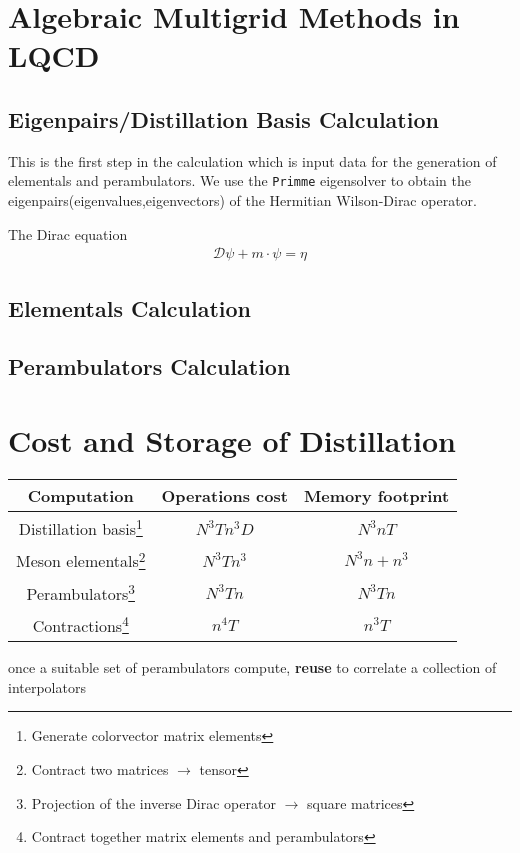 \section{Algebraic Multigrid Methods in LQCD}

\subsection{Eigenpairs/Distillation Basis Calculation}
This is the first step in the calculation which is input data for the generation of elementals and perambulators. We use the \verb|Primme| eigensolver to obtain the eigenpairs(eigenvalues,eigenvectors) of the Hermitian Wilson-Dirac operator\cite{PRIMME}\cite{Frommer:2020ovr}. 

The Dirac equation 
\begin{align}
  \mathcal{D}\psi + m \cdot \psi = \eta
\end{align}


\subsection{Elementals Calculation}

\subsection{Perambulators Calculation}

\section{Cost and Storage of Distillation}
      \vspace{1em}
       
         \begin{minipage}{16cm}
        \hspace*{2em}\begin{tabular}{ccc}
        Computation    & Operations cost & Memory footprint \\ \hline
        Distillation basis\footnote{Generate colorvector matrix elements}& $N^3Tn^3D$         & $N^3nT$      \\
        Meson elementals\footnote{Contract two matrices $\to$ tensor} & $N^3Tn^3$      & $N^3n + n^3$  \\
        Perambulators\footnote{Projection of the inverse Dirac operator $\to$ square matrices} & $N^3Tn$   & $N^3Tn$            \\
        Contractions\footnote{Contract together matrix elements and perambulators}   & $n^4T$    & $n^{3}T$   
        \end{tabular}
        \end{minipage}
        once a suitable set of perambulators compute, \textbf{reuse} to correlate a collection of interpolators
        
